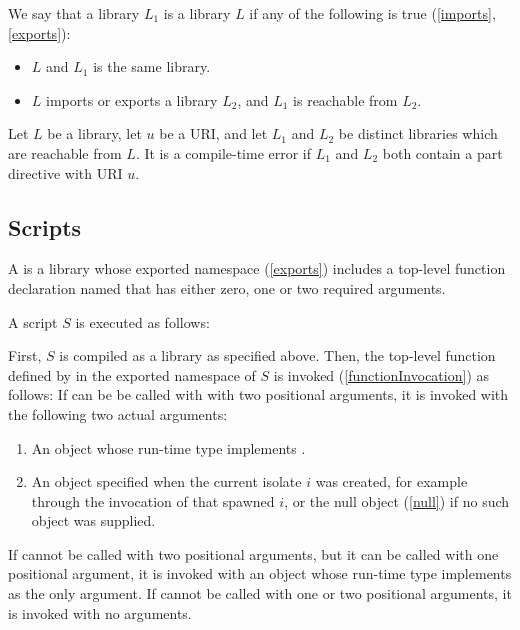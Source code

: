 \documentclass[makeidx]{article}
\begin{document}
{\LMHash{}%
We say that a library $L_1$ is  a library $L$ if
any of the following is true (\ref{imports}, \ref{exports}):
\begin{itemize}
\item $L$ and $L_1$ is the same library.
\item $L$ imports or exports a library $L_2$, and $L_1$ is reachable from $L_2$.
\end{itemize}

\LMHash{}%
Let $L$ be a library, let $u$ be a URI,
and let $L_1$ and $L_2$ be distinct libraries which are reachable from $L$.
It is a compile-time error if $L_1$ and $L_2$ both contain
a part directive with URI $u$.



\subsection{Scripts}

\LMHash{}%
A  is a library whose exported namespace (\ref{exports}) includes
a top-level function declaration named 
that has either zero, one or two required arguments.

A script $S$ is executed as follows:

\LMHash{}%
First, $S$ is compiled as a library as specified above.
Then, the top-level function defined by 
in the exported namespace of $S$ is invoked (\ref{functionInvocation})
as follows:
If  can be be called with with two positional arguments,
it is invoked with the following two actual arguments:
\begin{enumerate}
\item An object whose run-time type implements .
\item An object specified when the current isolate $i$ was created,
for example through the invocation of  that spawned $i$,
or the null object (\ref{null}) if no such object was supplied.
\end{enumerate}
If  cannot be called with two positional arguments,
but it can be called with one positional argument,
it is invoked with an object whose run-time type implements 
as the only argument.
If  cannot be called with one or two positional arguments,
it is invoked with no arguments.

}
\end{document}
